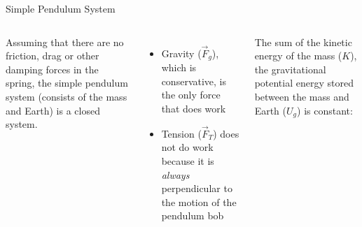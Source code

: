 \documentclass[12pt,compress,aspectratio=169]{beamer}
\begin{document}
\begin{frame}{Simple Pendulum System}
  \begin{columns}
    Assuming that there are no friction, drag or other damping forces in the
    spring, the simple pendulum system (consists of the mass and Earth) is a
    closed system.
    \begin{itemize}
    \item Gravity ($\vec F_g$), which is conservative, is the only force that
      does work
    \item Tension ($\vec F_T$) does not do work because it is \emph{always}
      perpendicular to the motion of the pendulum bob
    \end{itemize}
    The sum of the kinetic energy of the mass ($K$), the gravitational
    potential energy stored between the mass and Earth ($U_g$) is constant:

    
    \centering
  \end{columns}
\end{frame}
\end{document}
